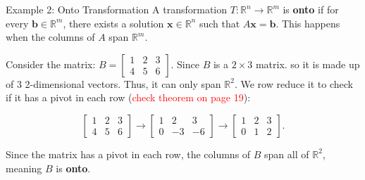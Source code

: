 \documentclass[10pt, aspectratio=169]{beamer}
\begin{document}
\begin{frame}{Example 2: Onto Transformation}
    A transformation \(T: \mathbb{R}^n \to \mathbb{R}^m\) is \textbf{onto} if for every \(\mathbf{b} \in \mathbb{R}^m\), there exists a solution \(\mathbf{x} \in \mathbb{R}^n\) such that \(A\mathbf{x} = \mathbf{b}\). This happens when the columns of \(A\) span \(\mathbb{R}^m\).

Consider the matrix:
\(
B =
\begin{bmatrix}
    1 & 2 & 3 \\
    4 & 5 & 6
\end{bmatrix}.
\)
Since \(B\) is a \(2 \times 3\) matrix. so it is made up of 3 2-dimensional vectors. Thus, it can only span \(\mathbb{R}^2\). We row reduce it to check if it has a pivot in each row (\textcolor{red}{check theorem on page 19}):

\[
\begin{bmatrix}
    1 & 2 & 3 \\
    4 & 5 & 6
\end{bmatrix}
\rightarrow
\begin{bmatrix}
    1 & 2 & 3 \\
    0 & -3 & -6
\end{bmatrix}
\rightarrow
\begin{bmatrix}
    1 & 2 & 3 \\
    0 & 1 & 2
\end{bmatrix}.
\]

Since the matrix has a pivot in each row, the columns of \(B\) span all of \(\mathbb{R}^2\), meaning \(B\) is \textbf{onto}.
\end{frame}
\end{document}
